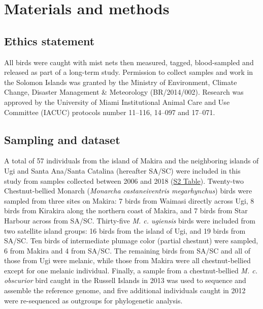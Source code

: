 \section{Materials and methods} \label{mon_methods}

\subsection{Ethics statement}
All birds were caught with mist nets then measured, tagged, blood-sampled and released as part of a long-term study. Permission to collect samples and work in the Solomon Islands was granted by the Ministry of Environment, Climate Change, Disaster Management \& Meteorology (BR/2014/002). Research was approved by the University of Miami Institutional Animal Care and Use Committee (IACUC) protocols number 11–116, 14–097 and 17–071.

\subsection{Sampling and dataset}
A total of 57 individuals from the island of Makira and the neighboring islands of Ugi and Santa Ana/Santa Catalina (hereafter \ac{SA/SC}) were included in this study from samples collected between 2006 and 2018 (\href{https://journals.plos.org/PLOSGENETICS/article?id=10.1371/journal.pgen.1010474#sec017}{S2 Table}). Twenty-two Chestnut-bellied Monarch (\textit{Monarcha castaneiventris megarhynchus}) birds were sampled from three sites on Makira: 7 birds from Waimasi directly across Ugi, 8 birds from Kirakira along the northern coast of Makira, and 7 birds from Star Harbour across from \ac{SA/SC}. Thirty-five \textit{M. c. ugiensis} birds were included from two satellite island groups: 16 birds from the island of Ugi, and 19 birds from \ac{SA/SC}. Ten birds of intermediate plumage color (partial chestnut) were sampled, 6 from Makira and 4 from \ac{SA/SC}. The remaining birds from \ac{SA/SC} and all of those from Ugi were melanic, while those from Makira were all chestnut-bellied except for one melanic individual. Finally, a sample from a chestnut-bellied \textit{M. c. obscurior} bird caught in the Russell Islands in 2013 was used to sequence and assemble the reference genome, and five additional individuals caught in 2012 were re-sequenced as outgroups for phylogenetic analysis.

